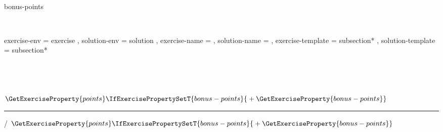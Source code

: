 \NewDocumentCommand \printtotalpoints {}
  {
      { \,  }
      { \,  }
  }

\NewDocumentCommand {}
  {
     {bonus-points}
      { \,  }
      { \,  }
  }

\NewDocumentCommand \printtotalbonus {}
  {
      { \,  }
      { \,  }
  }


 {
  exercise-env      = exercise ,
  solution-env      = solution ,
  exercise-name     =  ,
  solution-name     =  ,
  exercise-template = subsection* ,
  solution-template = subsection*
}


  {
    \subsection*
      {
        \XSIMmixedcase { \GetExerciseName } \nobreakspace
        \IfInsideSolutionF
          {
              { ~ { \normalfont \itshape {} } }
          }
    }
      {
        \marginpar
          {
            \IfInsideSolutionTF
              {
                \(
                  \GetExerciseProperty {points}
                  \IfExercisePropertySetT {bonus-points}
                    { {}+{} \GetExerciseProperty {bonus-points} }
                \) \,
                  {  }
                  {  }
              }
              {
                \rule {1.3cm} {1pt} /
                \(
                  \GetExerciseProperty {points}
                  \IfExercisePropertySetT {bonus-points}
                    { {}+{} \GetExerciseProperty {bonus-points} }
                \)
              }
          }
      }
  }
  {}


